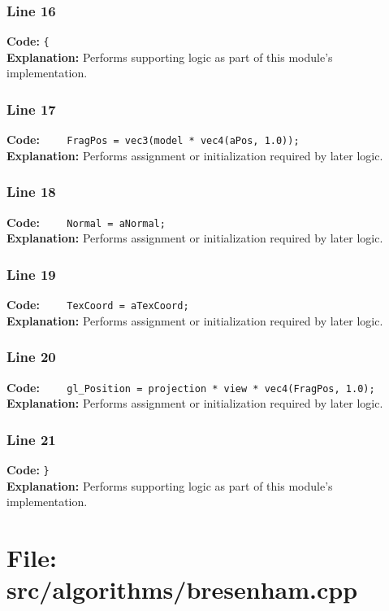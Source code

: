\documentclass[11pt,a4paper]{article}
\begin{document}
\subsubsection*{Line 16}
\textbf{Code:} \verb|{|\\
\textbf{Explanation:} Performs supporting logic as part of this module's implementation.

\subsubsection*{Line 17}
\textbf{Code:} \verb|    FragPos = vec3(model * vec4(aPos, 1.0));|\\
\textbf{Explanation:} Performs assignment or initialization required by later logic.

\subsubsection*{Line 18}
\textbf{Code:} \verb|    Normal = aNormal;|\\
\textbf{Explanation:} Performs assignment or initialization required by later logic.

\subsubsection*{Line 19}
\textbf{Code:} \verb|    TexCoord = aTexCoord;|\\
\textbf{Explanation:} Performs assignment or initialization required by later logic.

\subsubsection*{Line 20}
\textbf{Code:} \verb|    gl_Position = projection * view * vec4(FragPos, 1.0);|\\
\textbf{Explanation:} Performs assignment or initialization required by later logic.

\subsubsection*{Line 21}
\textbf{Code:} \verb|}|\\
\textbf{Explanation:} Performs supporting logic as part of this module's implementation.

\newpage
\section{File: src/algorithms/bresenham.cpp}
\end{document}
